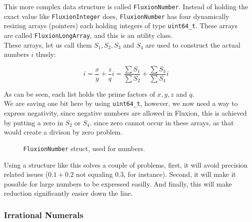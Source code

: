 \documentclass[11pt,a4paper]{article}
\newcommand{\code}[1]{\texttt{#1}}
\begin{document}
This more complex data structure is called \code{FluxionNumber}. Instead of holding the exact value like \code{FluxionInteger} does, \code{FluxionNumber} has four dynamically resizing arrays (pointers) each holding integers of type \code{uint64\_t}. These arrays are called \code{FluxionLongArray}, and this is an utility class.\\

These arrays, let us call them $S_1, S_2, S_3$ and $S_4$ are used to construct the actual numbers $i$ thusly:

\begin{equation}
i = \frac{x}{y} + \frac{z}{q}i = \frac{\sum S_1}{\sum S_2} + \frac{\sum S_3}{\sum S_4} i
\end{equation}

As can be seen, each list holds the prime factors of $x, y, z$ and $q$.\\

We are saving one bit here by using \code{uint64\_t}, however, we now need a way to express negativity, since negative numbers are allowed in Fluxion, this is achieved by putting a zero in $S_2$ or $S_4$. since zero cannot occur in these arrays, as that would create a divison by zero problem.

\begin{figure}[httb]
\begin{center}
\end{center}
\caption{\code{FluxionNumber} struct, used for numbers.}
\end{figure}

Using a structure like this solves a couple of problems, first, it will avoid precision related issues ($0.1 + 0.2$ not equaling $0.3$, for instance). Second, it will make it possible for large numbers to be expressed easilly. And finally, this will make reduction significantly easier down the line.

\subsubsection{Irrational Numerals}
\end{document}
